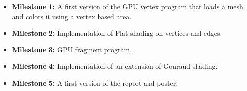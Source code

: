 \documentclass[11pt]{article}
\begin{document}
\begin{landscape}
\begin{itemize}
  \item [] \textbf{Milestone 1:} A first version of the GPU vertex program that loads a mesh and colors it using a vertex based area.
  \item [] \textbf{Milestone 2:} Implementation of Flat shading on vertices and edges.
  \item [] \textbf{Milestone 3:} GPU fragment program.
  \item [] \textbf{Milestone 4:} Implementation of an extension of Gouraud shading.
  \item [] \textbf{Milestone 5:} A first version of the report and poster.
\end{itemize}
\begin{flushright}\small{\color{gray!50}{The 15th week will be used only for possible delays or reviews.}}\end{flushright}
\end{landscape}
\end{document}
